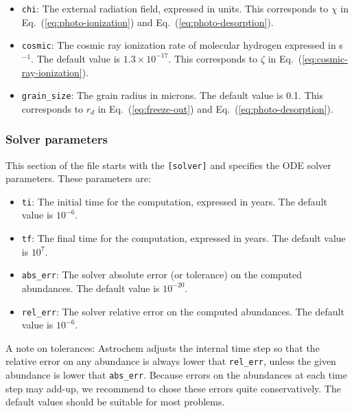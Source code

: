 \documentclass[a4paper,12pt]{article}
\begin{document}
\begin{itemize}

\item \verb=chi=: The external radiation field, expressed in
  \citet{Habing68} units. This corresponds to $\chi$ in
  Eq.~(\ref{eq:photo-ionization}) and Eq.~(\ref{eq:photo-desorption}).

\item \verb=cosmic=: The cosmic ray ionization rate of molecular
  hydrogen expressed in s$^{-1}$. The default value is $1.3 \times
  10^{-17}$. This corresponds to $\zeta$ in
  Eq.~(\ref{eq:cosmic-ray-ionization}).

\item \verb=grain_size=: The grain radius in microns. The default
  value is 0.1. This corresponds to $r_{d}$ in
  Eq.~(\ref{eq:freeze-out}) and Eq.~(\ref{eq:photo-desorption}).

\end{itemize}

\subsubsection{Solver parameters}
\label{sec:solver-parameters}

This section of the file starts with the \verb=[solver]= and specifies
the ODE solver parameters. These parameters are:

\begin{itemize}

\item \verb=ti=: The initial time for the computation, expressed in
  years. The default value is $10^{-6}$.

\item \verb=tf=: The final time for the computation, expressed in
  years. The default value is $10^{7}$.

\item \verb=abs_err=: The solver absolute error (or tolerance) on the
  computed abundances. The default value is $10^{-20}$.

\item \verb=rel_err=: The solver relative error on the computed
  abundances. The default value is $10^{-6}$.

\end{itemize}

A note on tolerances: Astrochem adjusts the internal time step so that
the relative error on any abundance is always lower that
\verb=rel_err=, unless the given abundance is lower that
\verb=abs_err=. Because errors on the abundances at each time step may
add-up, we recommend to chose these errors quite conservatively. The
default values should be suitable for most problems.
\end{document}
